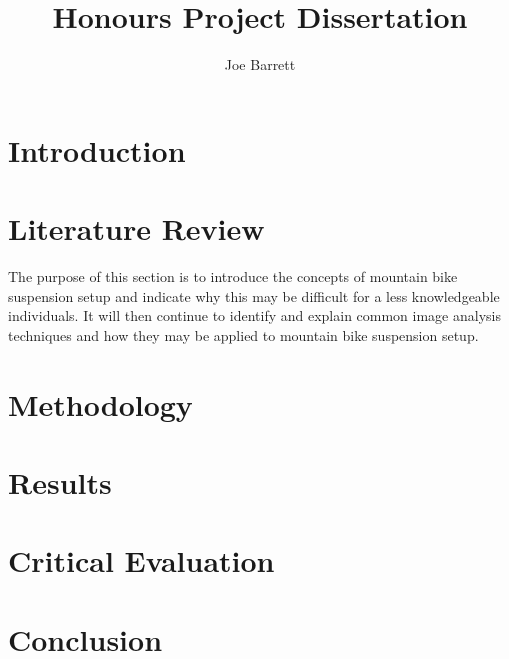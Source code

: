 \documentclass[a4paper, 12pt, hidelinks]{article}
\title{Honours Project Dissertation}
\author{Joe Barrett}
\begin{document}
	\setcounter{secnumdepth}{4}
	\setcounter{tocdepth}{3}
	
	
	\setcounter{page}{1}
	\begin{abstract}\noindent
		\blindtext
	\end{abstract}
	\newpage
	\tableofcontents
	\newpage
	\listoftables
	\newpage
	\listoffigures
	\newpage
	\section{Introduction}
	
	\section{Literature Review}
	The purpose of this section is to introduce the concepts of mountain bike suspension setup and indicate why this may be difficult for a less knowledgeable individuals. It will then continue to identify and explain common image analysis techniques and how they may be applied to mountain bike suspension setup.
	
	
	
	
	
	\newpage
	\section{Methodology}
	
	\newpage	
	\section{Results}
	\newpage
	\section{Critical Evaluation}
	\newpage
	\section{Conclusion}
	\newpage
		
	\newpage
	\printacronyms
	\printglossary[type=main]
\end{document}
